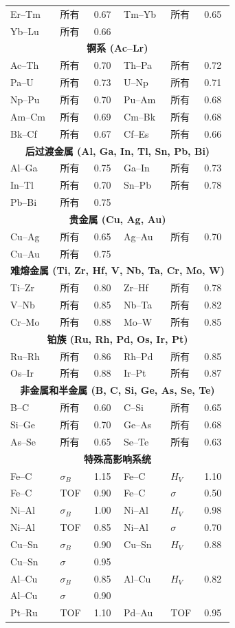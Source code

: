 \documentclass[12pt,a4paper]{article}
\begin{document}
\begin{longtable}{p{1.5cm}p{1.5cm}p{1.2cm}p{1.2cm}p{1.2cm}p{1.2cm}}
		Er–Tm & 所有 & 0.67 & Tm–Yb & 所有 & 0.65 \\
		Yb–Lu & 所有 & 0.66 & & & \\
		\multicolumn{6}{c}{\textbf{锕系 (Ac–Lr)}} \\
		Ac–Th & 所有 & 0.70 & Th–Pa & 所有 & 0.72 \\
		Pa–U  & 所有 & 0.73 & U–Np & 所有 & 0.71 \\
		Np–Pu & 所有 & 0.70 & Pu–Am & 所有 & 0.68 \\
		Am–Cm & 所有 & 0.69 & Cm–Bk & 所有 & 0.68 \\
		Bk–Cf & 所有 & 0.67 & Cf–Es & 所有 & 0.66 \\
		\multicolumn{6}{c}{\textbf{后过渡金属 (Al, Ga, In, Tl, Sn, Pb, Bi)}} \\
		Al–Ga & 所有 & 0.75 & Ga–In & 所有 & 0.73 \\
		In–Tl & 所有 & 0.70 & Sn–Pb & 所有 & 0.78 \\
		Pb–Bi & 所有 & 0.75 & & & \\
		\multicolumn{6}{c}{\textbf{贵金属 (Cu, Ag, Au)}} \\
		Cu–Ag & 所有 & 0.65 & Ag–Au & 所有 & 0.70 \\
		Cu–Au & 所有 & 0.75 & & & \\
		\multicolumn{6}{c}{\textbf{难熔金属 (Ti, Zr, Hf, V, Nb, Ta, Cr, Mo, W)}} \\
		Ti–Zr & 所有 & 0.80 & Zr–Hf & 所有 & 0.78 \\
		V–Nb & 所有 & 0.85 & Nb–Ta & 所有 & 0.82 \\
		Cr–Mo & 所有 & 0.88 & Mo–W & 所有 & 0.85 \\
		\multicolumn{6}{c}{\textbf{铂族 (Ru, Rh, Pd, Os, Ir, Pt)}} \\
		Ru–Rh & 所有 & 0.86 & Rh–Pd & 所有 & 0.85 \\
		Os–Ir & 所有 & 0.88 & Ir–Pt & 所有 & 0.87 \\
		\multicolumn{6}{c}{\textbf{非金属和半金属 (B, C, Si, Ge, As, Se, Te)}} \\
		B–C  & 所有 & 0.60 & C–Si  & 所有 & 0.65 \\
		Si–Ge & 所有 & 0.70 & Ge–As & 所有 & 0.68 \\
		As–Se & 所有 & 0.65 & Se–Te & 所有 & 0.63 \\
		\multicolumn{6}{c}{\textbf{特殊高影响系统}} \\
		Fe–C  & \(\sigma_B\) & 1.15 & Fe–C  & \(H_V\) & 1.10 \\
		Fe–C  & TOF & 0.90 & Fe–C  & \(\sigma\) & 0.50 \\
		Ni–Al & \(\sigma_B\) & 1.00 & Ni–Al & \(H_V\) & 0.98 \\
		Ni–Al & TOF & 0.85 & Ni–Al & \(\sigma\) & 0.70 \\
		Cu–Sn & \(\sigma_B\) & 0.90 & Cu–Sn & \(H_V\) & 0.88 \\
		Cu–Sn & \(\sigma\) & 0.95 & & & \\
		Al–Cu & \(\sigma_B\) & 0.85 & Al–Cu & \(H_V\) & 0.82 \\
		Al–Cu & \(\sigma\) & 0.90 & & & \\
		Pt–Ru & TOF & 1.10 & Pd–Au & TOF & 0.95 \\
		\bottomrule
	\end{longtable}
\end{document}
